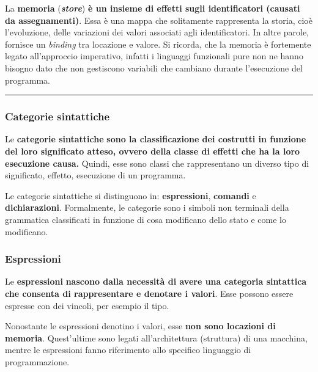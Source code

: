 \documentclass[a4paper]{article}
\newcommand{\longline}{\noindent\rule{\textwidth}{0.4pt}}
\begin{document}
	\noindent
	La \textcolor{Red3}{\textbf{memoria}} (\textbf{\emph{store}}) \textbf{è un insieme di effetti sugli identificatori (causati da assegnamenti)}. Essa è una mappa che solitamente rappresenta la storia, cioè l'evoluzione, delle variazioni dei valori associati agli identificatori. In altre parole, fornisce un \emph{binding} tra locazione e valore.\newline
	Si ricorda, che la memoria è fortemente legato all'approccio imperativo, infatti i linguaggi funzionali pure non ne hanno bisogno dato che non gestiscono variabili che cambiano durante l'esecuzione del programma.
	
	\longline
	
	\subsubsection{Categorie sintattiche}
	
	Le \textcolor{Red3}{\textbf{categorie sintattiche}} \textbf{sono la classificazione dei costrutti in funzione del loro significato atteso, ovvero della classe di effetti che ha la loro esecuzione causa.}\newline
	Quindi, esse sono classi che rappresentano un diverso tipo di significato, effetto, esecuzione di un programma.\newline
	
	\noindent
	Le categorie sintattiche si distinguono in: \textbf{espressioni}, \textbf{comandi} e \textbf{dichiarazioni}. Formalmente, le categorie sono i simboli non terminali della grammatica classificati in funzione di cosa modificano dello stato e come lo modificano.\newpage
	
	\subsubsection{Espressioni}
	
	Le \textcolor{Red3}{\textbf{espressioni}} \textbf{nascono dalla necessità di avere una categoria sintattica che consenta di rappresentare e denotare i valori}. Esse possono essere espresse con dei vincoli, per esempio il tipo.\newline
	
	\noindent
	Nonostante le espressioni denotino i valori, esse \textbf{non sono locazioni di memoria}. Quest'ultime sono legati all'architettura (struttura) di una macchina, mentre le espressioni fanno riferimento allo specifico linguaggio di programmazione.\newline
	
\end{document}
